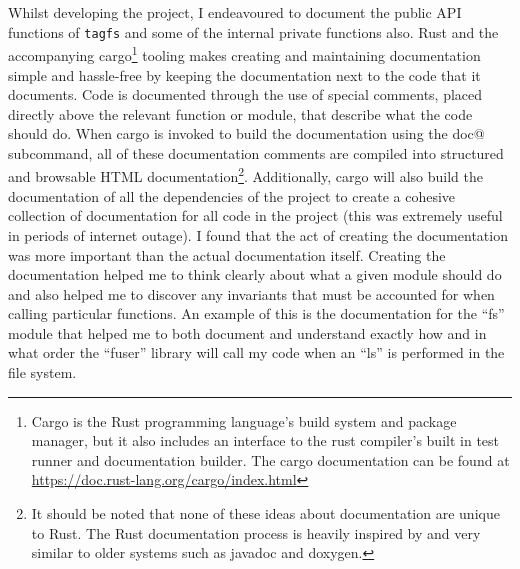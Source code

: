 Whilst developing the project, I endeavoured to document the public API
functions of \texttt{tagfs} and some of the internal private functions also.
Rust and the accompanying cargo\footnote{Cargo is the Rust programming
language's build system and package manager, but it also includes an interface
to the rust compiler's built in test runner and documentation builder. The
cargo documentation can be found at
\url{https://doc.rust-lang.org/cargo/index.html}} tooling makes creating and
maintaining documentation simple and hassle-free by keeping the documentation
next to the code that it documents. Code is documented through the use of
special comments, placed directly above the relevant function or module, that
describe what the code should do. When cargo is invoked to build the
documentation using the \verb@cargo doc@ subcommand, all of these documentation
comments are compiled into structured and browsable HTML
documentation\footnote{It should be noted that none of these ideas about
documentation are unique to Rust. The Rust documentation process is heavily
inspired by and very similar to older systems such as javadoc and doxygen.}.
Additionally, cargo will also build the documentation of all the dependencies
of the project to create a cohesive collection of documentation for all code in
the project (this was extremely useful in periods of internet outage).
I found that the act of creating the documentation was more important than the
actual documentation itself. Creating the documentation helped me to think
clearly about what a given module should do and also helped me to discover any
invariants that must be accounted for when calling particular functions. An
example of this is the documentation for the ``fs'' module that helped me to
both document and understand exactly how and in what order the ``fuser''
library will call my code when an ``ls'' is performed in the file system.


